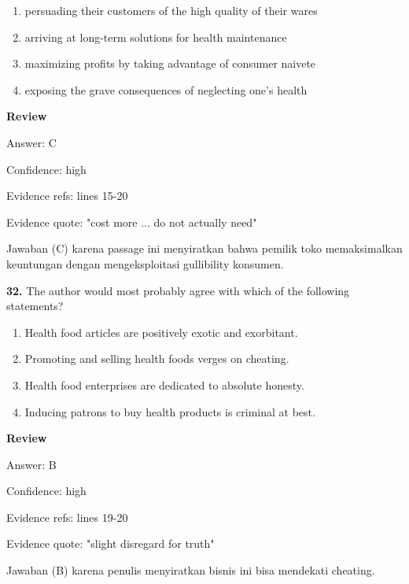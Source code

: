 \documentclass[12pt]{article}
\begin{document}
\begin{enumerate}[label=(\Alph*),leftmargin=*,itemsep=0.2em]
\item persuading their customers of the high quality of their wares
\item arriving at long-term solutions for health maintenance
\item maximizing profits by taking advantage of consumer naivete
\item exposing the grave consequences of neglecting one's health
\end{enumerate}
\par
\begingroup
\setlength{\parskip}{0pt}
\setlength{\parindent}{0pt}
\textbf{Review}\par
Answer: C\par
Confidence: high\par
Evidence refs: lines 15-20\par
Evidence quote: "cost more ... do not actually need"\par
Jawaban (C) karena passage ini menyiratkan bahwa pemilik toko memaksimalkan keuntungan dengan mengeksploitasi gullibility konsumen.\par
\endgroup
\par
\vspace{0.25\baselineskip}
\noindent\textbf{32.} The author would most probably agree with which of the following statements?
\begin{enumerate}[label=(\Alph*),leftmargin=*,itemsep=0.2em]
\item Health food articles are positively exotic and exorbitant.
\item Promoting and selling health foods verges on cheating.
\item Health food enterprises are dedicated to absolute honesty.
\item Inducing patrons to buy health products is criminal at best.
\end{enumerate}
\par
\begingroup
\setlength{\parskip}{0pt}
\setlength{\parindent}{0pt}
\textbf{Review}\par
Answer: B\par
Confidence: high\par
Evidence refs: lines 19-20\par
Evidence quote: "slight disregard for truth"\par
Jawaban (B) karena penulis menyiratkan bisnis ini bisa mendekati cheating.\par
\endgroup
\par
\vspace{0.25\baselineskip}
\end{document}
